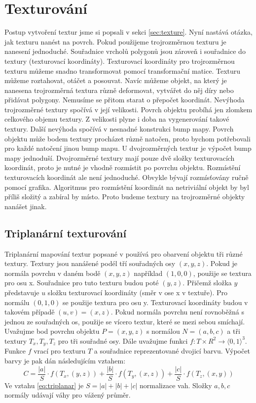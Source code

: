 








\section{Texturování}
Postup vytvoření textur jsme si popsali v sekci \ref{sec:texture}.
Nyní nastává otázka, jak texturu nanést na povrch.
Pokud použijeme trojrozměrnou texturu je nanesení jednoduché.
Souřadnice vrcholů polygonů jsou zároveň i souřadnice do textury (texturovací koordináty). 
Texturovací koordináty pro trojrozměrnou texturu můžeme snadno transformovat pomocí transformační matice.
Texturu můžeme roztahovat, otáčet a posouvat.
Navíc můžeme objekt, na který je nanesena trojrozměrná textura různě deformovat, vytvářet do něj díry nebo přidávat polygony.
Nemusíme se přitom starat o přepočet koordinát.
Nevýhoda trojrozměrné textury spočívá v její velikosti.
Povrch objektu probíhá jen zlomkem celkového objemu textury.
Z velikosti plyne i doba na vygenerování takové textury.
Další nevýhoda spočívá v nesnadné konstrukci bump mapy.
Povrch objektu může bodem textury procházet různě natočen, proto bychom potřebovali pro každé natočení jinou bump mapu.
U dvojrozměrných textur je výpočet bump mapy jednoduší.
Dvojrozměrné textury mají pouze dvě složky tex\-tu\-ro\-va\-cích koordinát, proto je nutné je vhodně rozmístit po povrchu objektu.
Rozmístění texturovacích koordinát ale není jednoduché.
Obvykle bývají rozmísťovány ručně pomocí grafika.
Algoritmus pro rozmístění koordinát na netriviální objekt by byl příliš složitý a zabíral by místo.
Proto budeme textury na trojrozměrné objekty nanášet jinak.

\subsection{Triplanární texturování}
Triplanární mapování textur popsané v \cite{KASKADY} používá pro obarvení objektu tři různé textury.
Textury jsou nanášené podél tří souřadných osy $(x,y,z)$.
Pokud je normála povrchu v daném bodě $(x,y,z)$ například $(1,0,0)$, použije se textura pro osu x.
Souřadnice pro tuto texturu budou poté $(y,z)$.
Přičemž složka $y$ představuje $u$ složku texturovací koordináty (směr v ose x v textuře).
Pro normálu $(0,1,0)$ se použije textura pro osu y.
Texturovací koordináty budou v takovém případě $(u,v)=(x,z)$.
Pokud normála povrchu není rovnoběžná s jednou ze souřadných os, použije se vícero textur, které se mezi sebou smíchají.
Uvažujme bod povrchu objektu $P=(x,y,z)$ s normálou $N=(a,b,c)$ a tři textury $T_x,T_y,T_z$ pro tři souřadné osy.
Dále uvažujme funkci $f:T \times R^2 \to \langle 0,1 \rangle ^3$.
Funkce $f$ vrací pro texturu $T$ a souřadnice reprezentované dvojicí barvu.
Výpočet barvy je pak dán následujícím vztahem:
\begin{equation}
\label{eq:triplanar}
C=\frac{|a|}{S} \cdot f(T_x,(y,z)) + \frac{|b|}{S} \cdot f(T_y,(x,z)) + \frac{|c|}{S} \cdot f(T_z,(x,y))
\end{equation}
Ve vztahu \ref{eq:triplanar} je $S=|a|+|b|+|c|$ normalizace vah.
Složky $a,b,c$ normály udávají váhy pro vážený průměr.

